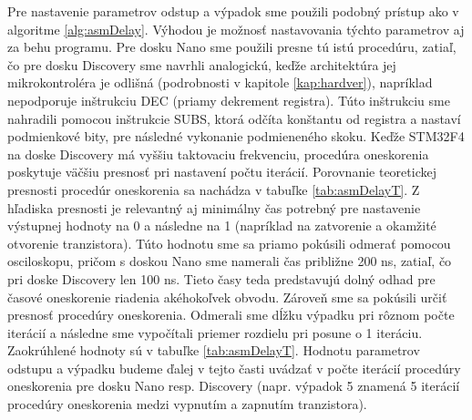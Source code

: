 Pre nastavenie parametrov odstup a výpadok sme použili podobný prístup ako v algoritme \ref{alg:asmDelay}. Výhodou je možnosť nastavovania týchto parametrov aj za behu programu. Pre dosku Nano sme použili presne tú istú procedúru, zatiaľ, čo pre dosku Discovery sme navrhli analogickú, keďže architektúra jej mikrokontroléra je odlišná (podrobnosti v kapitole \ref{kap:hardver}), napríklad nepodporuje inštrukciu DEC (priamy dekrement registra). Túto inštrukciu sme nahradili pomocou inštrukcie SUBS, ktorá odčíta konštantu od registra a nastaví podmienkové bity, pre následné vykonanie podmieneného skoku. Keďže STM32F4 na doske Discovery má vyššiu taktovaciu frekvenciu, procedúra oneskorenia poskytuje väčšiu presnosť pri nastavení počtu iterácií. Porovnanie teoretickej presnosti procedúr oneskorenia sa nachádza v tabuľke \ref{tab:asmDelayT}. Z hľadiska presnosti je relevantný aj minimálny čas potrebný pre nastavenie výstupnej hodnoty na 0 a následne na 1 (napríklad na zatvorenie a okamžité otvorenie tranzistora). Túto hodnotu sme sa priamo pokúsili odmerať pomocou osciloskopu, pričom s doskou Nano sme namerali čas približne 200 ns, zatiaľ, čo pri doske Discovery len 100 ns. Tieto časy teda predstavujú dolný odhad pre časové oneskorenie riadenia akéhokoľvek obvodu. Zároveň sme sa pokúsili určiť presnosť procedúry oneskorenia. Odmerali sme dĺžku výpadku pri rôznom počte iterácií a následne sme vypočítali priemer rozdielu pri posune o 1 iteráciu. Zaokrúhlené hodnoty sú v tabuľke \ref{tab:asmDelayT}. Hodnotu parametrov odstupu a výpadku budeme ďalej v tejto časti uvádzať v počte iterácií procedúry oneskorenia pre dosku Nano resp. Discovery (napr. výpadok 5 znamená 5 iterácií procedúry oneskorenia medzi vypnutím a zapnutím tranzistora).

